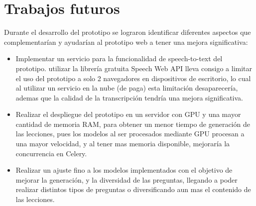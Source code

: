 \newpage
\section{Trabajos futuros}

Durante el desarrollo del prototipo se lograron identificar diferentes aspectos que complementarían y ayudarían al prototipo web a tener una mejora significativa:

\begin{itemize}
    \item Implementar un servicio para la funcionalidad de speech-to-text del prototipo. utilizar la librería gratuita Speech Web API lleva consigo a limitar el uso del prototipo a solo 2 navegadores en dispositivos de escritorio, lo cual al utilizar un servicio en la nube (de paga) esta limitación desaparecería, ademas que la calidad de la transcripción tendría una mejora significativa.

    \item Realizar el despliegue del prototipo en un servidor con GPU y una mayor cantidad de memoria RAM, para obtener un menor tiempo de generación de las lecciones, pues los modelos al ser procesados mediante GPU procesan a una mayor velocidad, y al tener mas memoria disponible, mejoraría la concurrencia en Celery.

    \item Realizar un ajuste fino a los modelos implementados con el objetivo de mejorar la generación, y la diversidad de las preguntas, llegando a poder realizar distintos tipos de preguntas o diversificando aun mas el contenido de las lecciones.
    
\end{itemize}